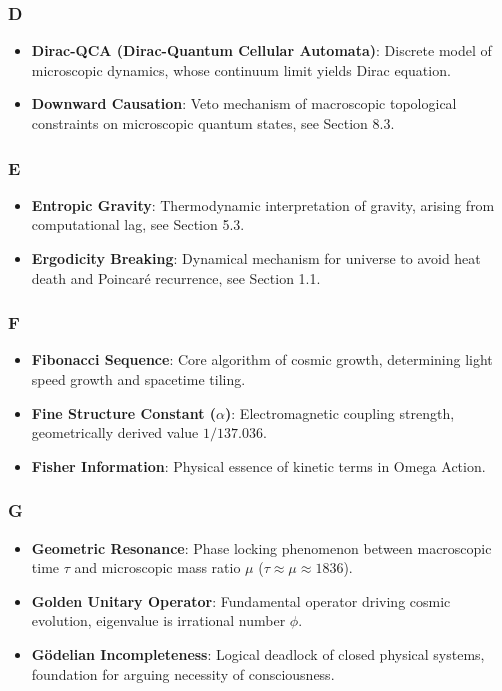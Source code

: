 \subsubsection{D}

\begin{itemize}
\item \textbf{Dirac-QCA (Dirac-Quantum Cellular Automata)}: Discrete model of microscopic dynamics, whose continuum limit yields Dirac equation.
\item \textbf{Downward Causation}: Veto mechanism of macroscopic topological constraints on microscopic quantum states, see Section 8.3.
\end{itemize}

\subsubsection{E}

\begin{itemize}
\item \textbf{Entropic Gravity}: Thermodynamic interpretation of gravity, arising from computational lag, see Section 5.3.
\item \textbf{Ergodicity Breaking}: Dynamical mechanism for universe to avoid heat death and Poincar\'{e} recurrence, see Section 1.1.
\end{itemize}

\subsubsection{F}

\begin{itemize}
\item \textbf{Fibonacci Sequence}: Core algorithm of cosmic growth, determining light speed growth and spacetime tiling.
\item \textbf{Fine Structure Constant ($\alpha$)}: Electromagnetic coupling strength, geometrically derived value $1/137.036$.
\item \textbf{Fisher Information}: Physical essence of kinetic terms in Omega Action.
\end{itemize}

\subsubsection{G}

\begin{itemize}
\item \textbf{Geometric Resonance}: Phase locking phenomenon between macroscopic time $\tau$ and microscopic mass ratio $\mu$ ($\tau \approx \mu \approx 1836$).
\item \textbf{Golden Unitary Operator}: Fundamental operator driving cosmic evolution, eigenvalue is irrational number $\phi$.
\item \textbf{G\"{o}delian Incompleteness}: Logical deadlock of closed physical systems, foundation for arguing necessity of consciousness.
\end{itemize}

